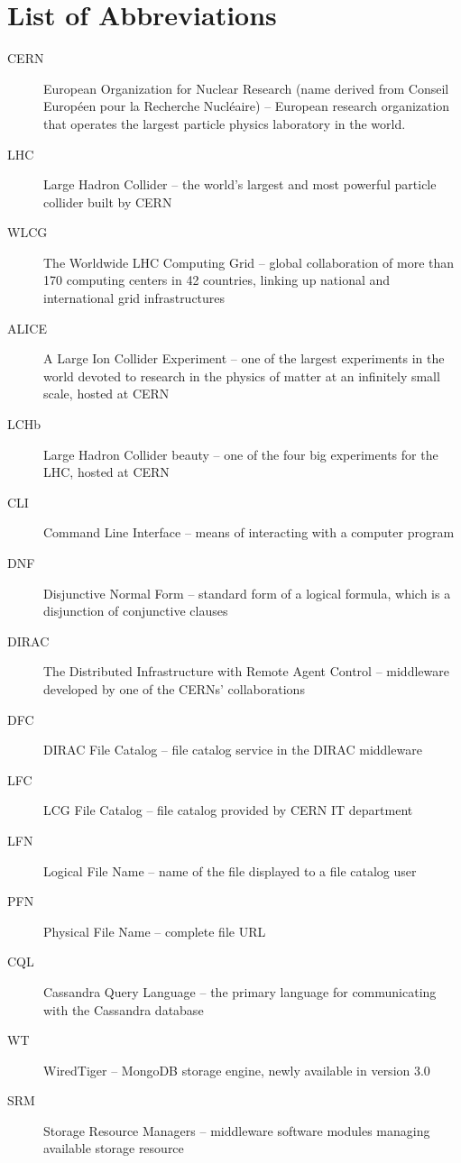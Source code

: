 \documentclass[12pt,a4paper]{report}
\def\chapwithtoc#1{
\chapter*{#1}
\addcontentsline{toc}{chapter}{#1}
}
\begin{document}
\chapwithtoc{List of Abbreviations}
\begin{description}
	\item[CERN] European Organization for Nuclear Research (name derived from Conseil Européen pour la Recherche 
	Nucléaire) -- European research organization that operates the largest particle physics laboratory in the 	
	world.
	\item[LHC] Large Hadron Collider -- the world's largest and most powerful particle collider built by CERN
	\item[WLCG] The Worldwide LHC Computing Grid -- global collaboration of more than 170 computing 
	centers in 42 countries, linking up national and international grid infrastructures
	\item[ALICE] A Large Ion Collider Experiment -- one of the largest experiments in the world devoted to 
	research in the physics of matter at an infinitely small scale, hosted at CERN
	\item[LCHb] Large Hadron Collider beauty -- one of the four big experiments for the LHC, hosted at CERN
	
	\item[CLI] Command Line Interface -- means of interacting with a computer program
	
	\item[DNF] Disjunctive Normal Form -- standard form of a logical formula, which is a disjunction of 
	conjunctive clauses

	\item[DIRAC] The Distributed Infrastructure with Remote Agent Control -- middleware developed by one of the 
	CERNs' collaborations
	\item[DFC] DIRAC File Catalog -- file catalog service in the DIRAC middleware 
	\item[LFC] LCG File Catalog -- file catalog provided by CERN IT department 
	
	\item[LFN] Logical File Name -- name of the file displayed to a file catalog user 
	\item[PFN] Physical File Name -- complete file URL 
	
	\item[CQL] Cassandra Query Language -- the primary language for communicating with the Cassandra database
	
	\item[WT] WiredTiger -- MongoDB storage engine, newly available in version 3.0
	
	\item[SRM] Storage Resource Managers -- middleware software modules managing available storage resource 
\end{description}
\end{document}
